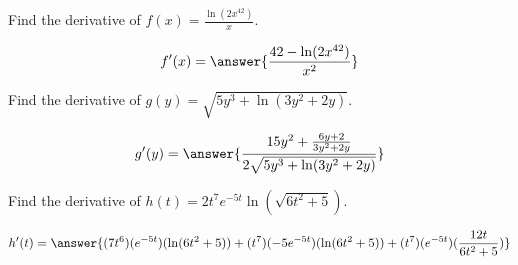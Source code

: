 \documentclass{ximera}
\author{Bobby Ramsey}
\begin{document}
\begin{exercise}
	Find the derivative of $\displaystyle f(x) = \frac{\ln(2x^{42})}{x}$.
	
	\[ f'(x) = \answer{  \frac{ 42-\ln(2x^{42}) }{x^2}      } \]
\end{exercise}

\begin{exercise}
	Find the derivative of $\displaystyle g(y) = \sqrt{5y^3+\ln(3y^2+2y)}$.

	\[ g'(y) = \answer{\frac{15y^2 + \frac{6y+2}{3y^2+2y}}{2\sqrt{5y^3+\ln(3y^2+2y)}}  }\]
\end{exercise}

\begin{exercise}
	Find the derivative of $\displaystyle h(t) = 2t^7e^{-5t}\ln(\sqrt{6t^2+5})$.
	
	\[ h'(t) = \answer{    (7t^6)(e^{-5t})(\ln(6t^2+5))+(t^7)(-5e^{-5t})(\ln(6t^2+5))+(t^7)(e^{-5t})(\frac{12t}{6t^2+5})   }\]
\end{exercise}
\end{document}
